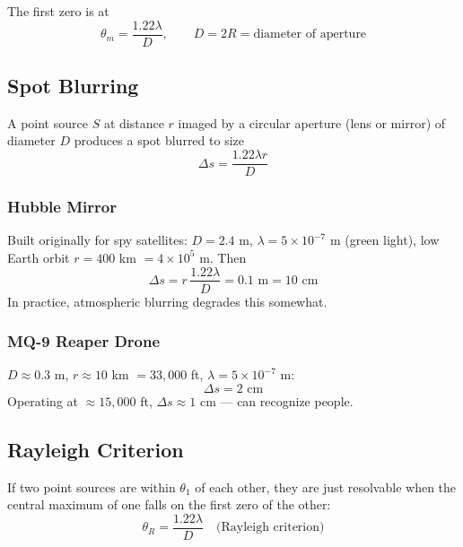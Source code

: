 \documentclass[11pt]{report}
\begin{document}
The first zero is at
\begin{equation}
\boxed{\theta_m = \frac{1.22\lambda}{D}, \qquad D = 2R = \text{diameter of aperture}}
\end{equation}

\subsection*{Spot Blurring}

A point source $S$ at distance $r$ imaged by a circular aperture (lens or mirror) of diameter $D$ produces a spot blurred to size
\begin{equation}
\Delta s = \frac{1.22\lambda r}{D}
\end{equation}

\subsubsection*{Hubble Mirror}

Built originally for spy satellites: $D = 2.4$ m, $\lambda = 5\times 10^{-7}$ m (green light), low Earth orbit $r = 400$ km $= 4\times 10^5$ m. Then
\begin{equation}
\Delta s = r\,\frac{1.22\lambda}{D} = 0.1\text{ m} = 10\text{ cm}
\end{equation}
In practice, atmospheric blurring degrades this somewhat.

\subsubsection*{MQ-9 Reaper Drone}

$D \approx 0.3$ m, $r \approx 10$ km $= 33{,}000$ ft, $\lambda = 5\times 10^{-7}$ m:
\begin{equation}
\Delta s = 2\text{ cm}
\end{equation}
Operating at $\approx 15{,}000$ ft, $\Delta s \approx 1$ cm --- can recognize people.

\subsection*{Rayleigh Criterion}

If two point sources are within $\theta_1$ of each other, they are just resolvable when the central maximum of one falls on the first zero of the other:
\begin{equation}
\boxed{\theta_R = \frac{1.22\lambda}{D} \quad \text{(Rayleigh criterion)}}
\end{equation}
\end{document}

